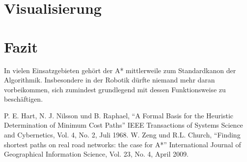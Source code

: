 \documentclass[10pt,twocolumn]{scrartcl}
\begin{document}
\section*{Visualisierung}

\section*{Fazit}

In vielen Einsatzgebieten gehört der A* mittlerweile zum Standardkanon der Algorithmik. Insbesondere in der Robotik dürfte niemand mehr daran vorbeikommen, sich zumindest grundlegend mit dessen Funktionsweise zu beschäftigen.



\begin{thebibliography}{99}
 P. E. Hart, N. J. Nilsson und B. Raphael, ``A Formal Basis for the Heuristic Determination of Minimum Cost Paths'' IEEE Transactions of Systems  Science and Cybernetics, Vol. 4, No. 2, Juli 1968.
 W. Zeng und R.L. Church, ``Finding shortest paths on real road networks: the case for A*'' International Journal of Geographical Information Science, Vol. 23, No. 4, April 2009.

\end{thebibliography}
\end{document}
